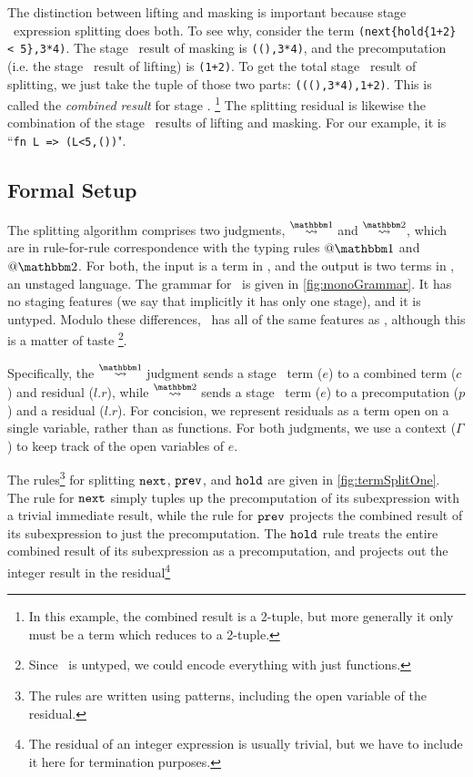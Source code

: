 The distinction between lifting and masking is important because stage \bbone\ expression splitting does both.
To see why, consider the term \verb|(next{hold{1+2} < 5},3*4)|.
The stage \bbone\ result of masking is \verb|((),3*4)|, 
and the precomputation (i.e. the stage \bbone\ result of lifting) is \verb|(1+2)|.
To get the total stage \bbone\ result of splitting, we just take the tuple of those two parts: \verb|(((),3*4),1+2)|.  
This is called the {\em combined result} for stage \bbone.
\footnote{In this example, the combined result is a 2-tuple, but more generally it only must be a term which reduces to a 2-tuple.}
The splitting residual is likewise the combination of the stage \bbtwo\ results of lifting and masking.
For our example, it is ``\verb|fn L => (L<5,())|".

\subsection {Formal Setup}

The splitting algorithm comprises two judgments, $\splitonesym$ and $\splittwosym$,
which are in rule-for-rule correspondence with the typing rules $@\bbone$ and $@\bbtwo$.
For both, the input is a term in \lang, and the output is two terms in \langmono, an
unstaged language.  The grammar for \langmono\ is given in \ref{fig:monoGrammar}.  It has no
staging features (we say that implicitly it has only one stage), and it is untyped.  
Modulo these differences, \langmono\ has all of the same features as \lang, 
although this is a matter of taste
\footnote{Since \langmono\ is untyped, we could encode everything with just functions.}.

Specifically, the $\splitonesym$ judgment sends a stage \bbone\ term ($e$) to a combined term ($c$) and residual ($l.r$),
while $\splittwosym$ sends a stage \bbtwo\ term ($e$) to a precomputation ($p$) and a residual ($l.r$).
For concision, we represent residuals as a term open on a single variable, rather than as functions.
For both judgments, we use a context ($\Gamma$) to keep track of the
open variables of $e$.



The rules\footnote{The rules are written using patterns, including the open variable of the residual.} 
for splitting ${\tt next}$, ${\tt prev}$, and ${\tt hold}$ are given in \ref{fig:termSplitOne}.
The rule for ${\tt next}$ simply tuples up the precomputation of its subexpression with a trivial immediate result,
while the rule for ${\tt prev}$ projects the combined result of its subexpression to just the precomputation.
The ${\tt hold}$ rule treats the entire combined result of its subexpression as a precomputation, 
and projects out the integer result in the residual\footnote{The residual of an integer expression is usually trivial, 
but we have to include it here for termination purposes.}

